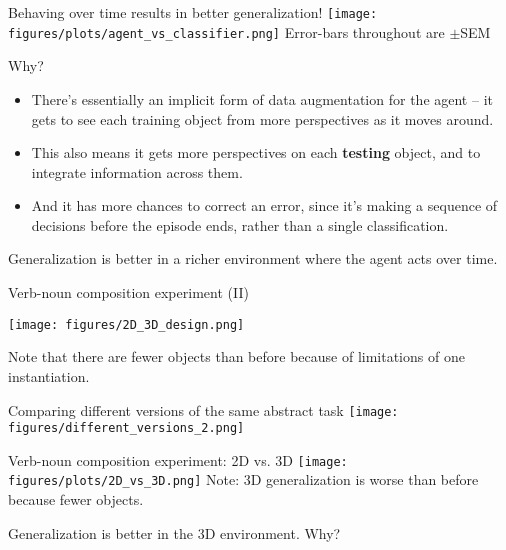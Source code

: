 \documentclass{beamer}
\begin{document}
\begin{frame}{Behaving over time results in better generalization!}
\texttt{[image: figures/plots/agent\_vs\_classifier.png]}
{\small Error-bars throughout are \(\pm\)SEM}
\end{frame}

\begin{frame}{Why?}
\begin{itemize}
\item There's essentially an implicit form of data augmentation for the agent -- it gets to see each training object from more perspectives as it moves around.
\item This also means it gets more perspectives on each \textbf{testing} object, and to integrate information across them.
\item And it has more chances to correct an error, since it's making a sequence of decisions before the episode ends, rather than a single classification. 
\end{itemize}
\end{frame}

\begin{frame}[standout]
Generalization is better in a richer environment where the agent acts over time.
\end{frame}

\begin{frame}{Verb-noun composition experiment (II)}
\begin{center}
\texttt{[image: figures/2D\_3D\_design.png]}
\end{center}
Note that there are fewer objects than before because of limitations of one instantiation.
\end{frame}

\begin{frame}{Comparing different versions of the same abstract task}
\centering
\texttt{[image: figures/different\_versions\_2.png]}
\end{frame}

\begin{frame}{Verb-noun composition experiment: 2D vs. 3D}
\texttt{[image: figures/plots/2D\_vs\_3D.png]}
{\small Note: 3D generalization is worse than before because fewer objects.}
\end{frame}

\begin{frame}[standout]
Generalization is better in the 3D environment. Why?
\end{frame}
\end{document}
